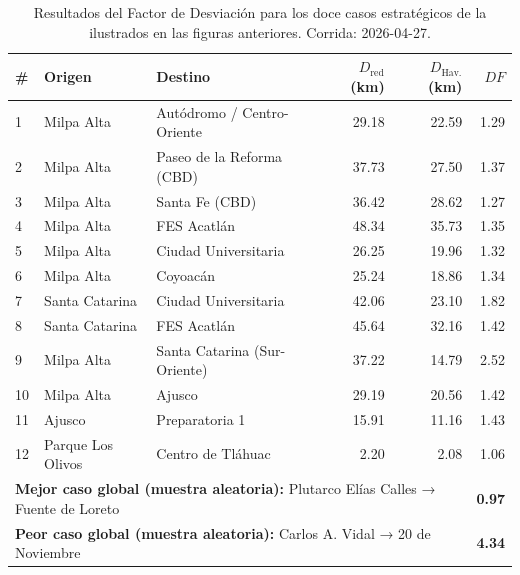 \begin{table}[H]
    \centering
    \caption[Factor de Desviación — resumen de los doce casos de estudio]{
    Resultados del Factor de Desviación para los doce casos estratégicos de la
    \zmvm{} ilustrados en las figuras anteriores. Corrida: 2026-04-27.}
    \label{tab:df-casos}
    \small
    \begin{tabularx}{\textwidth}{|l|X|X|r|r|r|}
        \hline
        \textbf{\#} & \textbf{Origen} & \textbf{Destino} &
        \textbf{$D_{\text{red}}$ (km)} & \textbf{$D_{\text{Hav.}}$ (km)} & \textbf{$DF$} \\
        \hline
         1 & Milpa Alta        & Autódromo / Centro-Oriente   & 29.18 & 22.59 & 1.29 \\
         2 & Milpa Alta        & Paseo de la Reforma (CBD)    & 37.73 & 27.50 & 1.37 \\
         3 & Milpa Alta        & Santa Fe (CBD)               & 36.42 & 28.62 & 1.27 \\
         4 & Milpa Alta        & FES Acatlán                  & 48.34 & 35.73 & 1.35 \\
         5 & Milpa Alta        & Ciudad Universitaria         & 26.25 & 19.96 & 1.32 \\
         6 & Milpa Alta        & Coyoacán                     & 25.24 & 18.86 & 1.34 \\
         7 & Santa Catarina    & Ciudad Universitaria         & 42.06 & 23.10 & 1.82 \\
         8 & Santa Catarina    & FES Acatlán                  & 45.64 & 32.16 & 1.42 \\
         9 & Milpa Alta        & Santa Catarina (Sur-Oriente) & 37.22 & 14.79 & 2.52 \\
        10 & Milpa Alta        & Ajusco                       & 29.19 & 20.56 & 1.42 \\
        11 & Ajusco            & Preparatoria 1               & 15.91 & 11.16 & 1.43 \\
        12 & Parque Los Olivos & Centro de Tláhuac            &  2.20 &  2.08 & 1.06 \\
        \hline
        \multicolumn{5}{|l|}{\textbf{Mejor caso global (muestra aleatoria):}
        Plutarco Elías Calles → Fuente de Loreto} & \textbf{0.97} \\
        \multicolumn{5}{|l|}{\textbf{Peor caso global (muestra aleatoria):}
        Carlos A. Vidal → 20 de Noviembre} & \textbf{4.34} \\
        \hline
    \end{tabularx}
\end{table}

